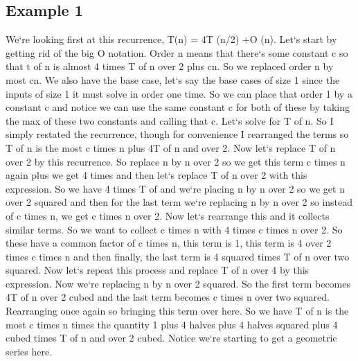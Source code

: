 \subsection{Example 1}
We`re looking first at this recurrence, T(n) = 4T (n/2) +O (n).
Let`s start by getting rid of the big O notation.
Order n means that there`s some constant c so that t of n is almost 4 times T of n over 2 plus cn.
So we replaced order n by most cn.
We also have the base case, let`s say the base cases of size 1 since the inputs of size 1 it must solve in order one time.
So we can place that order 1 by a constant c and notice we can use the same constant c for both of these by taking the max of these two constants and calling that c.
Let`s solve for T of n.
So I simply restated the recurrence, though for convenience I rearranged the terms so T of n is the most c times n plus 4T of n and over 2.
Now let`s replace T of n over 2 by this recurrence.
So replace n by n over 2 so we get this term c times n again plus we get 4 times and then let`s replace T of n over 2 with this expression.
So we have 4 times T of and we`re placing n by n over 2 so we get n over 2 squared and then for the last term we`re replacing n by n over 2 so instead of c times n, we get c times n over 2.
Now let`s rearrange this and it collects similar terms.
So we want to collect c times n with 4 times c times n over 2.
So these have a common factor of c times n, this term is 1, this term is 4 over 2 times c times n and then finally, the last term is 4 squared times T of n over two squared.
Now let`s repeat this process and replace T of n over 4 by this expression.
Now we`re replacing n by n over 2 squared.
So the first term becomes 4T of n over 2 cubed and the last term becomes c times n over two squared.
Rearranging once again so bringing this term over here.
So we have T of n is the most c times n times the quantity 1 plus 4 halves plus 4 halves squared plus 4 cubed times T of n and over 2 cubed.
Notice we`re starting to get a geometric series here.

